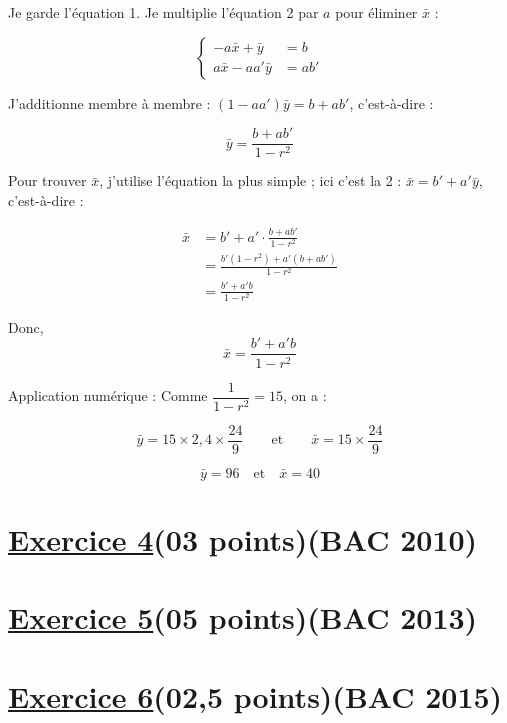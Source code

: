 \documentclass[12pt,a4paper]{article}
\begin{document}
\begin{enumerate}
Je garde l'équation 1. Je multiplie l'équation 2 par \( a \) pour éliminer \( \bar{x} \) :

\[
\left\{
\begin{aligned}
- a\bar{x} + \bar{y} &= b \\
a\bar{x} - aa'\bar{y} &= ab'
\end{aligned}
\right.
\]

J’additionne membre à membre : \( (1 - aa')\bar{y} = b + ab' \), c’est-à-dire :

\[
\bar{y} = \frac{b + ab'}{1 - r^2}
\]

Pour trouver \( \bar{x} \), j’utilise l’équation la plus simple ; ici c’est la 2 : \( \bar{x} = b' + a'\bar{y} \), c’est-à-dire :

\[
\begin{aligned}
\bar{x} &= b' + a'\cdot \frac{b + ab'}{1 - r^2} \\
       &= \frac{b'(1 - r^2) + a'(b + ab')}{1 - r^2} \\
       &= \frac{b' + a'b}{1 - r^2}
\end{aligned}
\]

Donc,
\[
\bar{x} = \frac{b' + a'b}{1 - r^2}
\]

Application numérique : Comme \( \dfrac{1}{1 - r^2} = 15 \), on a :

\[
\bar{y} = 15 \times 2{,}4 \times \frac{24}{9}
\qquad \text{et} \qquad
\bar{x} = 15 \times \frac{24}{9}
\]

\[
\boxed{\bar{y} = 96 \quad \text{et} \quad \bar{x} = 40}
\]

\end{enumerate}

\section*{\underline{Exercice 4}(03 points)(BAC 2010)}
\section*{\underline{Exercice 5}(05 points)(BAC 2013)}
\section*{\underline{Exercice 6}(02,5 points)(BAC 2015)}
\end{document}
